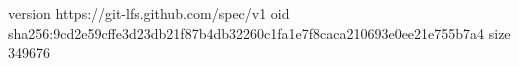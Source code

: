 version https://git-lfs.github.com/spec/v1
oid sha256:9cd2e59cffe3d23db21f87b4db32260c1fa1e7f8caca210693e0ee21e755b7a4
size 349676
